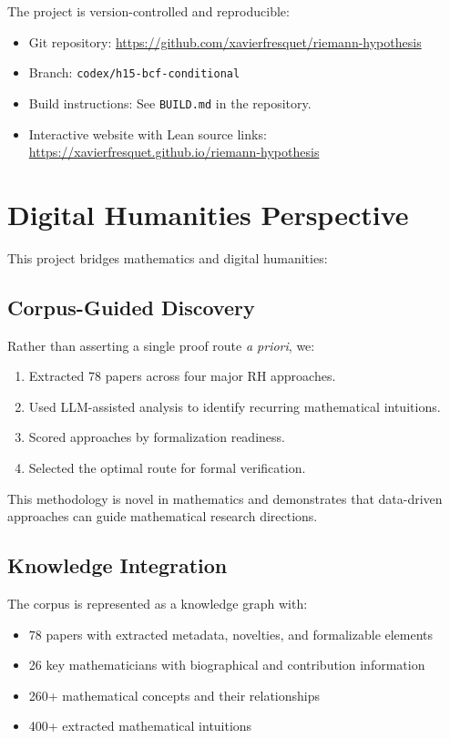 \documentclass[11pt,a4paper]{article}
\begin{document}
The project is version-controlled and reproducible:

\begin{itemize}
  \item Git repository: \url{https://github.com/xavierfresquet/riemann-hypothesis}
  \item Branch: \texttt{codex/h15-bcf-conditional}
  \item Build instructions: See \texttt{BUILD.md} in the repository.
  \item Interactive website with Lean source links: \url{https://xavierfresquet.github.io/riemann-hypothesis}
\end{itemize}

\section{Digital Humanities Perspective}
\label{sec:dh}

This project bridges mathematics and digital humanities:

\subsection{Corpus-Guided Discovery}

Rather than asserting a single proof route \emph{a priori}, we:
\begin{enumerate}
  \item Extracted 78 papers across four major RH approaches.
  \item Used LLM-assisted analysis to identify recurring mathematical intuitions.
  \item Scored approaches by formalization readiness.
  \item Selected the optimal route for formal verification.
\end{enumerate}

This methodology is novel in mathematics and demonstrates that data-driven approaches can guide mathematical research directions.

\subsection{Knowledge Integration}

The corpus is represented as a knowledge graph with:
\begin{itemize}
  \item 78 papers with extracted metadata, novelties, and formalizable elements
  \item 26 key mathematicians with biographical and contribution information
  \item 260+ mathematical concepts and their relationships
  \item 400+ extracted mathematical intuitions
\end{itemize}
\end{document}
